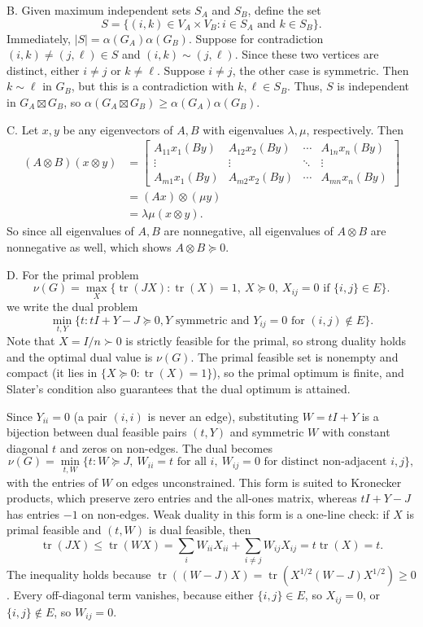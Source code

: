 \documentclass[11pt,letterpaper]{article}
\theoremstyle{definition}
\newcommand{\tr}{\operatorname{tr}}
\begin{document}
B.
Given maximum independent sets $S_A$ and $S_B$, define the set 
\[
S = \{(i,k)\in V_A\times V_B: i\in S_A\text{ and }k\in S_B\}.
\]
Immediately, $|S| = \alpha(G_A)\alpha(G_B)$.
Suppose for contradiction $(i,k)\neq(j,\ell)\in S$ and $(i,k)\sim (j,\ell)$.
Since these two vertices are distinct, either $i\neq j$ or $k\neq \ell$.
Suppose $i\neq j$, the other case is symmetric.
Then $k\sim\ell$ in $G_B$, but this is a contradiction with $k,\ell\in S_B$.
Thus, $S$ is independent in $G_A\boxtimes G_B$, so $\alpha(G_A \boxtimes G_B) \geq \alpha(G_A)\alpha(G_B)$.

C.
Let $x,y$ be any eigenvectors of $A,B$ with eigenvalues $\lambda,\mu$, respectively. 
Then 
\begin{align*}(A\otimes B) (x\otimes y) &= \begin{bmatrix}
A_{11}x_1(By) & A_{12}x_2(By) & \cdots & A_{1n}x_n(By) \\
\vdots & \vdots & \ddots & \vdots \\
A_{m1}x_1(By) & A_{m2}x_2(By) & \cdots & A_{mn}x_n(By)
\end{bmatrix} \\
&= (Ax)\otimes (\mu y) \\
&= \lambda\mu (x\otimes y).
\end{align*}
So since all eigenvalues of $A,B$ are nonnegative, all eigenvalues of $A\otimes B$ are nonnegative as well, which shows $A\otimes B\succeq 0$.

D.
For the primal problem
\[
\nu(G) = \max_X \bigl\{\operatorname{tr}(JX) : \operatorname{tr}(X) = 1,\ X \succeq 0,\ X_{ij} = 0 \text{ if } \{i, j\} \in E\bigr\}.
\]
we write the dual problem 
\[
\min_{t,Y} \{t: tI+Y-J\succeq 0, Y \text{ symmetric and } Y_{ij}=0 \text{ for }(i,j)\notin E\}.
\]
Note that $X=I/n\succ0$ is strictly feasible for the primal, so strong duality holds and the optimal dual value is $\nu(G)$.
The primal feasible set is nonempty and compact (it lies in $\{X\succeq 0 : \tr(X) = 1\}$), so the primal optimum is finite, and Slater's condition also guarantees that the dual optimum is attained.

Since $Y_{ii} = 0$ (a pair $(i,i)$ is never an edge), substituting $W = tI + Y$ is a bijection between dual feasible pairs $(t,Y)$ and symmetric $W$ with constant diagonal $t$ and zeros on non-edges. The dual becomes
\[
\nu(G) = \min_{t,W}\bigl\{t : W \succeq J,\ W_{ii} = t \text{ for all } i,\ W_{ij} = 0 \text{ for distinct non-adjacent } i,j\bigr\},
\]
with the entries of $W$ on edges unconstrained.
This form is suited to Kronecker products, which preserve zero entries and the all-ones matrix, whereas $tI+Y-J$ has entries $-1$ on non-edges.
Weak duality in this form is a one-line check: if $X$ is primal feasible and $(t,W)$ is dual feasible, then
\[
\tr(JX) \leq \tr(WX) = \sum_i W_{ii}X_{ii} + \sum_{i\neq j} W_{ij}X_{ij} = t\tr(X) = t.
\]
The inequality holds because $\tr((W-J)X) = \tr(X^{1/2}(W-J)X^{1/2}) \geq 0$. Every off-diagonal term vanishes, because either $\{i,j\}\in E$, so $X_{ij} = 0$, or $\{i,j\}\notin E$, so $W_{ij} = 0$.
\end{document}
